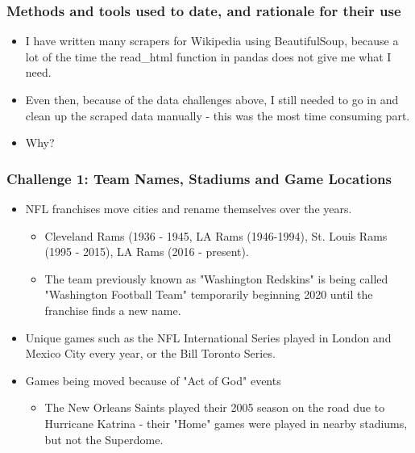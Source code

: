 \documentclass[t]{beamer}
\begin{document}
\begin{frame}
\frametitle{Methods and tools used to date, and rationale for their use}
\begin{itemize}
	\item<1->{I have written many scrapers for Wikipedia using BeautifulSoup, because a lot of the time the read\_html function in pandas does not give me what I need.}
	\item<2->{Even then, because of the data challenges above, I still needed to go in and clean up the scraped data manually - this was the most time consuming part.}
	\item<3->{Why?}
\end{itemize}
\end{frame}




\begin{frame}
\frametitle{Challenge 1: Team Names, Stadiums and Game Locations}
\begin{itemize}
\item<1-> NFL franchises move cities and rename themselves over the years.
	\begin{itemize}
	\item<2->{Cleveland Rams (1936 - 1945, LA Rams (1946-1994), St. Louis Rams (1995 - 2015), LA Rams (2016 - present).}
	\item<2->{The team previously known as "Washington Redskins" is being called "Washington Football Team" temporarily beginning 2020 until the franchise finds a new name.}
	\end{itemize}
\item<3-> Unique games such as the NFL International Series played in London and Mexico City every year, or the Bill Toronto Series.
\item<4-> Games being moved because of "Act of God" events
	\begin{itemize}
		\item<5->{The New Orleans Saints played their 2005 season on the road due to Hurricane Katrina - their "Home" games were played in nearby stadiums, but not the Superdome.}
	\end{itemize}
		
		\end{itemize}

\end{frame}

\end{document}
